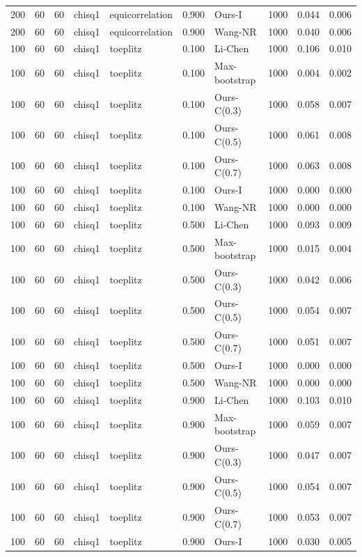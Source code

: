 \begin{tabular}{rrrllrlrrr}
200 & 60 & 60 & chisq1 & equicorrelation & 0.900 & Ours-I & 1000 & 0.044 & 0.006 \\
200 & 60 & 60 & chisq1 & equicorrelation & 0.900 & Wang-NR & 1000 & 0.040 & 0.006 \\
100 & 60 & 60 & chisq1 & toeplitz & 0.100 & Li-Chen & 1000 & 0.106 & 0.010 \\
100 & 60 & 60 & chisq1 & toeplitz & 0.100 & Max-bootstrap & 1000 & 0.004 & 0.002 \\
100 & 60 & 60 & chisq1 & toeplitz & 0.100 & Ours-C(0.3) & 1000 & 0.058 & 0.007 \\
100 & 60 & 60 & chisq1 & toeplitz & 0.100 & Ours-C(0.5) & 1000 & 0.061 & 0.008 \\
100 & 60 & 60 & chisq1 & toeplitz & 0.100 & Ours-C(0.7) & 1000 & 0.063 & 0.008 \\
100 & 60 & 60 & chisq1 & toeplitz & 0.100 & Ours-I & 1000 & 0.000 & 0.000 \\
100 & 60 & 60 & chisq1 & toeplitz & 0.100 & Wang-NR & 1000 & 0.000 & 0.000 \\
100 & 60 & 60 & chisq1 & toeplitz & 0.500 & Li-Chen & 1000 & 0.093 & 0.009 \\
100 & 60 & 60 & chisq1 & toeplitz & 0.500 & Max-bootstrap & 1000 & 0.015 & 0.004 \\
100 & 60 & 60 & chisq1 & toeplitz & 0.500 & Ours-C(0.3) & 1000 & 0.042 & 0.006 \\
100 & 60 & 60 & chisq1 & toeplitz & 0.500 & Ours-C(0.5) & 1000 & 0.054 & 0.007 \\
100 & 60 & 60 & chisq1 & toeplitz & 0.500 & Ours-C(0.7) & 1000 & 0.051 & 0.007 \\
100 & 60 & 60 & chisq1 & toeplitz & 0.500 & Ours-I & 1000 & 0.000 & 0.000 \\
100 & 60 & 60 & chisq1 & toeplitz & 0.500 & Wang-NR & 1000 & 0.000 & 0.000 \\
100 & 60 & 60 & chisq1 & toeplitz & 0.900 & Li-Chen & 1000 & 0.103 & 0.010 \\
100 & 60 & 60 & chisq1 & toeplitz & 0.900 & Max-bootstrap & 1000 & 0.059 & 0.007 \\
100 & 60 & 60 & chisq1 & toeplitz & 0.900 & Ours-C(0.3) & 1000 & 0.047 & 0.007 \\
100 & 60 & 60 & chisq1 & toeplitz & 0.900 & Ours-C(0.5) & 1000 & 0.054 & 0.007 \\
100 & 60 & 60 & chisq1 & toeplitz & 0.900 & Ours-C(0.7) & 1000 & 0.053 & 0.007 \\
100 & 60 & 60 & chisq1 & toeplitz & 0.900 & Ours-I & 1000 & 0.030 & 0.005 \\

\end{tabular}
